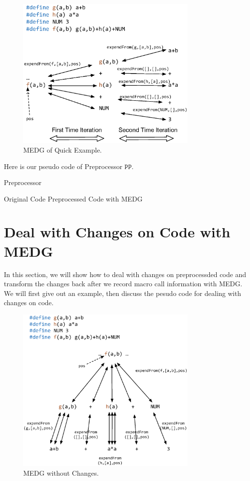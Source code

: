 \documentclass[11pt]{article}
\theoremstyle{theorem}
\theoremstyle{lemma}
\theoremstyle{property}
\theoremstyle{definition}
\theoremstyle{assumption}
\begin{document}
\begin{figure}[H]
\centering
\includegraphics[width=9cm]{quick_example.eps}
\caption{MEDG of Quick Example.}
\end{figure}

Here is our pseudo code of Preprocessor $\mathtt{PP}$. 

\begin{algorithm}
    \caption{Preprocessor}
    \begin{algorithmic}[1] 
        \Require Original Code
        \Ensure Preprocessed Code with MEDG
        \EndFunction
            
    \end{algorithmic}
\end{algorithm}
\newpage

\section{Deal with Changes on Code with MEDG}
In this section, we will show how to deal with changes on preprocessded code and transform the changes back after we record macro call information with MEDG. We will first give out an example, then discuss the pesudo code for dealing with changes on code.

\begin{figure}[H]
\centering
\includegraphics[width=9cm]{original.eps}
\caption{MEDG without Changes.}
\end{figure}
\end{document}
